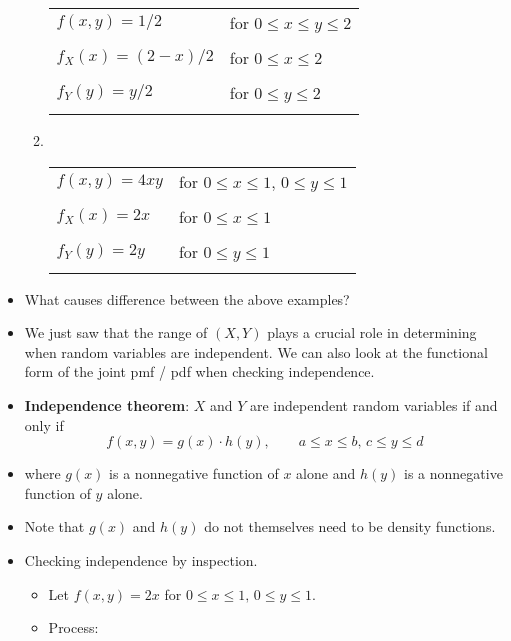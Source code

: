 \documentclass{article}
\begin{document}
\begin{itemize}
\begin{enumerate}
        \begin{tabular}{l l}
            $f(x, y) = 1/2$ & for $0 \le x \le y \le 2$ \\\\
            $f_X(x) = (2 - x)/2$ & for $0 \le x \le 2$ \\\\
            $f_Y(y) = y/2$ & for $0 \le y \le 2$ \\\\
        \end{tabular}
        \item \hspace{10pt}\\
        \begin{tabular}{l l}
            $f(x, y) = 4xy$ & for $0 \le x \le 1, \, 0 \le y \le 1$ \\\\
            $f_X(x) = 2x$ & for $0 \le x \le 1$ \\\\
            $f_Y(y) = 2y$ & for $0 \le y \le 1$ \\\\
        \end{tabular}
    \end{enumerate}
    \item What causes difference between the above examples?\vspace{100pt}
    \item We just saw that the range of $(X,Y)$ plays a crucial role in determining when random variables are independent. We can also look at the functional form of the joint pmf / pdf when checking independence.
    \item \textbf{Independence theorem}: $X$ and $Y$ are independent random variables if and only if 
    \[f(x,y) = g(x) \cdot h(y), \quad\quad a \le x \le b, \, c \le y \le d\]\smallskip
    \item[] where $g(x)$ is a nonnegative function of $x$ alone and $h(y)$ is a nonnegative function of $y$ alone.
    \item[] Note that $g(x)$ and $h(y)$ do not themselves need to be density functions.
    \item Checking independence by inspection.
    \begin{itemize}
        \item Let $f(x, y) = 2x$ \quad for $0 \le x \le 1, \, 0 \le y \le 1$.
        \item Process:
        \begin{enumerate}

\end{enumerate}
\end{itemize}
\end{itemize}
\end{document}
